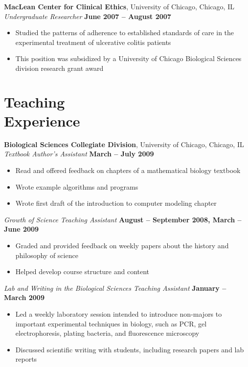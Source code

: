 \documentclass[margin,line]{resume}
\begin{document}
\begin{resume}
    \textbf{MacLean Center for Clinical Ethics}, University of Chicago, Chicago, IL \\\vspace{1mm}%
    \textsl{Undergraduate Researcher} \hfill \textbf{June 2007 -- August 2007}
    \begin{itemize}
    \item Studied the patterns of adherence to established standards of care in the experimental treatment of ulcerative colitis patients
    \item This position was subsidized by a University of Chicago Biological Sciences division research grant award
    \end{itemize}

    \section{\mysidestyle Teaching\\Experience}

    \textbf{Biological Sciences Collegiate Division}, University of Chicago, Chicago, IL \\\vspace{1mm}%
    \textsl{Textbook Author's Assistant} \hfill \textbf{March -- July 2009}\vspace{1mm}%
    \begin{itemize}
    \item Read and offered feedback on chapters of a mathematical biology textbook
    \item Wrote example algorithms and programs
    \item Wrote first draft of the introduction to computer modeling chapter
    \end{itemize}

    \textsl{Growth of Science Teaching Assistant} \hfill \textbf{August -- September 2008, March -- June 2009}
    \begin{itemize}
    \item Graded and provided feedback on weekly papers about the history and philosophy of science
    \item Helped develop course structure and content
    \end{itemize}

    \textsl{Lab and Writing in the Biological Sciences Teaching Assistant} \hfill \textbf{January -- March 2009}\vspace{1mm}%
    \begin{itemize}
    \item Led a weekly laboratory session intended to introduce non-majors to important experimental techniques in biology, such as PCR, gel electrophoresis, plating bacteria, and fluorescence microscopy
    \item Discussed scientific writing with students, including research papers and lab reports 
    \end{itemize}


\end{resume}
\end{document}

